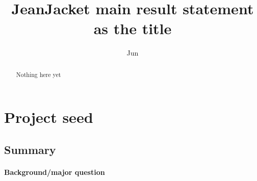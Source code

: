 \documentclass[onecolumn,11pt]{article}
\title{JeanJacket main result statement as the title}
\author[a]{Jun}
\affil[a]{University of California Irvine}
\date{} %
\begin{document}
\maketitle

\begin{abstract}
Nothing here yet
\end{abstract}












\section{Project seed}

\subsection*{Summary}
\paragraph{Background/major question} \lipsum[2]
\end{document}
